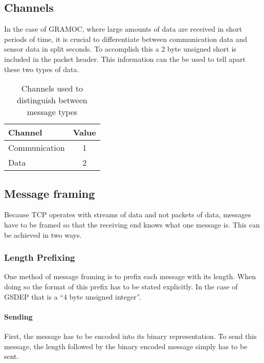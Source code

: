 \subsection{Channels}
\label{sec:channels}

In the case of GRAMOC, where large amounts of data are received in short periods of time, it is crucial to differentiate between communication data and sensor data in split seconds. To accomplish this a 2 byte unsigned short is included in the packet header. This information can the be used to tell apart these two types of data.

\begin{table}[H]
    \centering
    \begin{tabular}{| l | c |}
    \hline
    \textbf{Channel} & \textbf{Value} \\ \hline
    Communication & 1 \\ \hline
    Data & 2 \\
    \hline
    \end{tabular}
    \caption{Channels used to distinguish between message types}
    \label{tab:channels}
\end{table}

\subsection{Message framing}
\label{sec:messageframing}
Because TCP operates with streams of data and not packets of data, messages have to be framed so that the receiving end knows what one message is. This can be achieved in two ways. \cite{MessageFramingCleary,MessageFramingSkotzko}

\subsubsection{Length Prefixing}

One method of message framing is to prefix each message with its length. When doing so the format of this prefix has to be stated explicitly. In the case of GSDEP that is a ``4 byte unsigned integer''.

\paragraph{Sending}

First, the message has to be encoded into its binary representation. To send this message, the length followed by the binary encoded message simply has to be sent.

